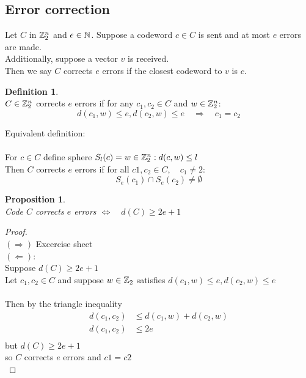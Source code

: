 \documentclass[]{article}
\newtheorem{prop}[thm]{Proposition}
\theoremstyle{definition}
\newtheorem*{defn}{Definition}
\theoremstyle{remark}
\numberwithin{equation}{section}
\begin{document}
	\subsection{Error correction}
		Let $C$ in $\mathbb{Z}_2^n$ and $e\in \mathbb N$. 
		Suppose a codeword $c \in C$ is sent and at most $e$ errors are made.\\
		Additionally, suppose a vector $v$ is received.\\
		Then we say $C$ corrects $e$ errors if the closest codeword to $v$ is $c$.\\
		\begin{defn}\hfill\\
		$C \in \mathbb{Z}_2^n$ corrects $e$ errors if for any $c_1, c_2 \in C$ and $w \in \mathbb{Z}_2^n$:\\
		\[
			d(c_1,w) \leq e, d(c_2, w) \leq e\quad \Rightarrow \quad c_1 = c_2
		\]%

		Equivalent definition:\\
		\\
		For $c \in C$ define sphere $S_l(c) = {w \in \mathbb{Z}_2^n: d(c,w) \leq l}$\\
		Then $C$ corrects $e$ errors if for all $c1, c_2 \in C, \quad c_1\neq2 $:\\
		\[
			S_e(c_1) \cap S_e(c_2) \neq \emptyset
		\]

		\end{defn}
		\begin{prop}\hfill \\
		Code $C$ corrects $e$ errors $\Leftrightarrow \quad d(C) \geq 2e+1$
		\end{prop}
		\begin{proof}\hfill\\
		$(\Rightarrow)$ Excercise sheet\\
		$(\Leftarrow)$: \\
		Suppose $d(C) \geq 2e+1$\\
		Let $c_1, c_2 \in C $ and suppose $w \in \mathbb{Z}_2$ satisfies $d(c_1, w) \leq e, d(c_2,w) \leq e$\\
		\\
	 	Then by the triangle inequality\\
	 	\begin{align*}
		d(c_1,c_2) &\leq d(c_1,w) + d(c_2, w)\\
		d(c_1,c_2) &\leq 2e\\
		\end{align*}
		but $d(C) \geq 2e +1$\\
		so $C$ corrects $e$ errors and $c1 = c2$\\
		\end{proof}
\end{document}
